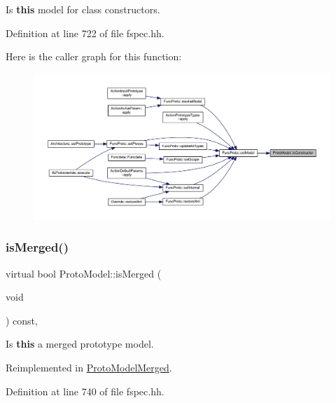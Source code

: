 Is {\bfseries{this}} model for class constructors. 



Definition at line 722 of file fspec.\+hh.

Here is the caller graph for this function\+:
\nopagebreak
\begin{figure}[H]
\begin{center}
\leavevmode
\includegraphics[width=350pt]{class_proto_model_a8699b4b61ebc7565dbfd7ec7ab600eca_icgraph}
\end{center}
\end{figure}
\mbox{\label{class_proto_model_a580207b945d3734b6f1e6023b3ca2678}} 
\subsubsection{\texorpdfstring{isMerged()}{isMerged()}}
{\footnotesize\ttfamily virtual bool Proto\+Model\+::is\+Merged (\begin{DoxyParamCaption}\item[{void}]{ }\end{DoxyParamCaption}) const\hspace{0.3cm}{\ttfamily [inline]}, {\ttfamily [virtual]}}



Is {\bfseries{this}} a merged prototype model. 



Reimplemented in \mbox{\hyperlink{class_proto_model_merged_aea3dceb1497499800015607bbfd2d863}{Proto\+Model\+Merged}}.



Definition at line 740 of file fspec.\+hh.

